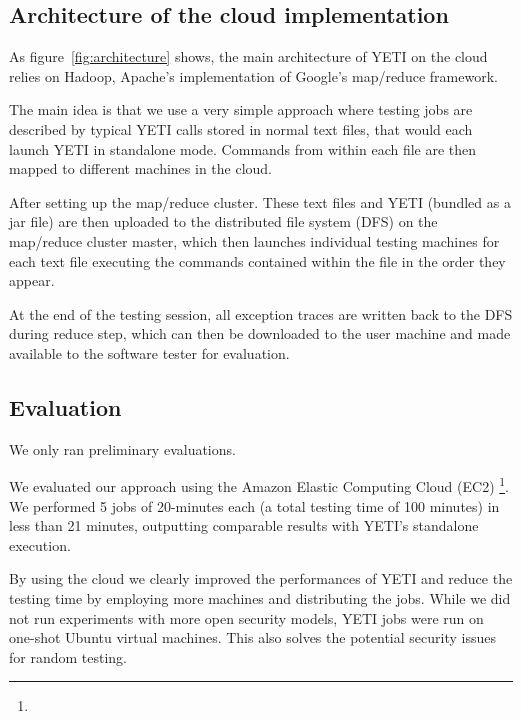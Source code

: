 \subsection{Architecture of the cloud implementation}

As figure~\ref{fig:architecture} shows, the main architecture of YETI on the cloud 
relies on Hadoop, Apache's implementation of Google's map/reduce framework. 

The main idea is that we use a very simple approach where testing jobs 
are described by typical YETI calls stored in normal text files, that would each launch YETI in standalone mode. 
Commands from within each file are then mapped to different machines in the cloud. 

After setting up the map/reduce cluster. These text files and YETI (bundled as a jar file) are then uploaded to the 
distributed file system (DFS) on the map/reduce cluster master, which then launches individual testing machines 
for each text file executing the commands contained within the file in the order they appear.

At the end of the testing session, all exception traces are written back to the DFS during reduce step, which can then be downloaded to the 
user machine and made available to the software tester for evaluation.


\subsection{Evaluation}

We only ran preliminary evaluations.

We evaluated our approach using the Amazon Elastic Computing Cloud (EC2) \footnote{}.
We performed 5 jobs of 20-minutes each (a total testing time of 100 minutes) in less 
than 21 minutes, outputting comparable results with YETI's standalone execution.

By using the cloud we clearly improved the performances of YETI and reduce the testing time by 
employing more machines and distributing the jobs.
While we did not run experiments with more open security models, 
YETI jobs were run on one-shot Ubuntu virtual machines. This also solves
the potential security issues for random testing.
